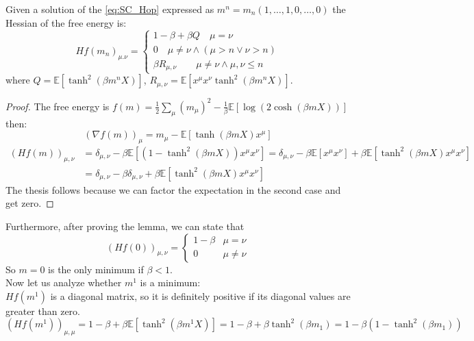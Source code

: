 \begin{lemma}
    Given a solution of the \cref{eq:SC_Hop} expressed as $ m^n= m_n(1,\ldots,1,0,\ldots,0)$ the Hessian of the free energy is:
    \[
       Hf(m_n)_{\mu.\nu}=\begin{cases}
           1- \beta + \beta Q   \quad  \mu = \nu \\
           0  \quad \mu \neq \nu \land (\mu > n \lor \nu >n)  \\
           \beta R_{\mu,\nu} \quad \quad \mu \neq \nu \land \mu,\nu \leq n
       \end{cases}
    \]
    where $Q = \mathbb{E}\left[\tanh^2\left(\beta m^n X\right)\right]$, $R_{\mu,\nu} =  \mathbb{E}\left[x^\mu x^\nu \tanh^2\left(\beta m^n X\right)\right] $.
    \begin{proof}
        The free energy is $f(m) = \frac12 \sum_\mu  \left(m_\mu\right)^2 -\frac{1}{\beta} \mathbb{E}\left[\log\left(2 \cosh\left(\beta  m X \right)\right)\right] $ then:
        \[
        \left(\nabla f\left(m\right)\right)_\mu = m_\mu - \mathbb{E}\left[\tanh\left(\beta  m X \right) x^\mu  \right]
        \]
        \begin{align*}
             \left(Hf\left(m\right)\right)_{\mu,\nu} &= \delta_{\mu,\nu}  -\beta \mathbb{E}\left[\left(1 - \tanh^2\left(\beta  m X \right)\right) x^\mu x^\nu \right] = \delta_{\mu,\nu}  - \beta\mathbb{E}\left[ x^\mu x^\nu\right] +\beta \mathbb{E}\left[\tanh^2\left(\beta  m X \right)x^\mu x^\nu \right] \\
             &=\delta_{\mu,\nu}  - \beta\delta_{\mu,\nu} +\beta \mathbb{E}\left[\tanh^2\left(\beta  m X \right)x^\mu x^\nu\right]
        \end{align*}
        The thesis follows because we can factor the expectation in the second case and get zero.
    \end{proof}
\end{lemma}
Furthermore, after proving the lemma, we can state that
\[
\left(Hf\left(0\right)\right)_{\mu,\nu} = \begin{cases}
    1 - \beta &  \mu = \nu \\
    0 & \mu \neq \nu
\end{cases}
\]
So $m=0$ is the only minimum if $\beta < 1$.  \\
Now let us analyze whether $m^1$ is a minimum: \\
$Hf(m^1)$ is a diagonal matrix, so it is definitely positive if its diagonal values are greater than zero.\\
    \[
     \left(Hf\left(m^1\right)\right)_{\mu,\mu} = 1- \beta + \beta  \mathbb{E}\left[\tanh^2\left(\beta m^1 X\right)\right] = 1- \beta + \beta \tanh^2\left(\beta m_1\right) = 1 - \beta\left(1-  \tanh^2\left(\beta m_1\right)\right)
    \]
